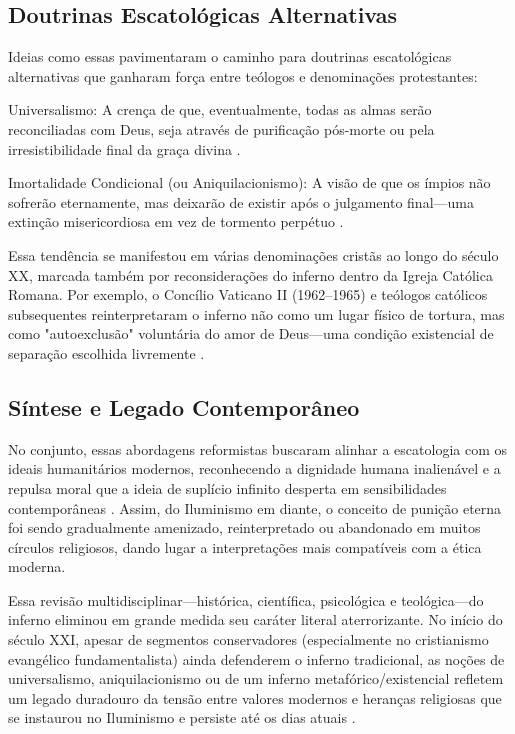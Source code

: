 \subsection{Doutrinas Escatológicas Alternativas}

Ideias como essas pavimentaram o caminho para doutrinas escatológicas alternativas que ganharam força entre teólogos e denominações protestantes:

Universalismo: A crença de que, eventualmente, todas as almas serão reconciliadas com Deus, seja através de purificação pós-morte ou pela irresistibilidade final da graça divina \cite{Ramelli2013}.

Imortalidade Condicional (ou Aniquilacionismo): A visão de que os ímpios não sofrerão eternamente, mas deixarão de existir após o julgamento final---uma extinção misericordiosa em vez de tormento perpétuo \cite{Fudge2000}.

Essa tendência se manifestou em várias denominações cristãs ao longo do século XX, marcada também por reconsiderações do inferno dentro da Igreja Católica Romana. Por exemplo, o Concílio Vaticano II (1962--1965) e teólogos católicos subsequentes reinterpretaram o inferno não como um lugar físico de tortura, mas como "autoexclusão" voluntária do amor de Deus---uma condição existencial de separação escolhida livremente \cite{Ratzinger1988}.

\subsection{Síntese e Legado Contemporâneo}

No conjunto, essas abordagens reformistas buscaram alinhar a escatologia com os ideais humanitários modernos, reconhecendo a dignidade humana inalienável e a repulsa moral que a ideia de suplício infinito desperta em sensibilidades contemporâneas \cite{Walls1992}. Assim, do Iluminismo em diante, o conceito de punição eterna foi sendo gradualmente amenizado, reinterpretado ou abandonado em muitos círculos religiosos, dando lugar a interpretações mais compatíveis com a ética moderna.

Essa revisão multidisciplinar---histórica, científica, psicológica e teológica---do inferno eliminou em grande medida seu caráter literal aterrorizante. No início do século XXI, apesar de segmentos conservadores (especialmente no cristianismo evangélico fundamentalista) ainda defenderem o inferno tradicional, as noções de universalismo, aniquilacionismo ou de um inferno metafórico/existencial refletem um legado duradouro da tensão entre valores modernos e heranças religiosas que se instaurou no Iluminismo e persiste até os dias atuais \cite{Parry2003}.

